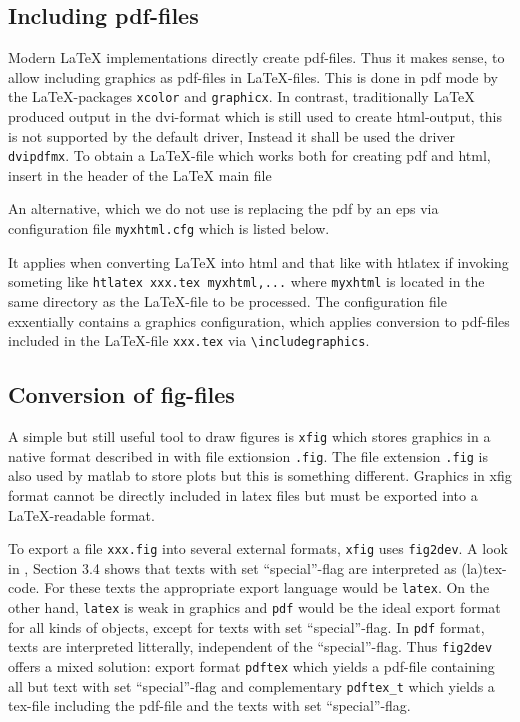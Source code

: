 \documentclass[12pt]{article}
\begin{document}
\subsection{Including pdf-files}\label{subsec:figpdf}

Modern \LaTeX{} implementations directly create pdf-files. 
Thus it makes sense, to allow including graphics as pdf-files 
in \LaTeX-files. 
This is done in pdf mode 
by the \LaTeX-packages {\tt xcolor} and {\tt graphicx}. 
In contrast, traditionally \LaTeX{} produced output in the \gls{dvi}-format 
which is still used to create \gls{html}-output, 
this is not supported by the default driver, 
Instead it shall be used the driver {\tt dvipdfmx}. 
To obtain a \LaTeX-file which works both for creating pdf and html, 
insert in the header of the \LaTeX{} main file 
%
\lstset{language=tex, basicstyle=\small}


An alternative, which we do not use 
is replacing the pdf by an \gls{eps} via configuration file {\tt myxhtml.cfg} 
which is listed below. 
%
\lstset{language=tex, basicstyle=\scriptsize}

%
It applies when converting \LaTeX{} into html and that like 
with htlatex if invoking someting like {\tt htlatex xxx.tex myxhtml,...} 
where {\tt myxhtml} is located in the same directory as the \LaTeX-file 
to be processed. 
The configuration file exxentially contains a graphics configuration, 
which applies conversion to pdf-files included in the \LaTeX-file {\tt xxx.tex}
via {\tt \textbackslash includegraphics}. 


\subsection{Conversion of fig-files}\label{subsec:fig2dev}

A simple but still useful tool to draw figures is {\tt xfig} 
which stores graphics in a native format 
described in \cite{XFigF} with file extionsion {\tt .fig}. 
The file extension {\tt .fig} is also used by matlab to store plots 
but this is something different. 
Graphics in xfig format cannot be directly included in latex files 
but must be exported into a \LaTeX-readable format. 

To export a file {\tt xxx.fig} into several external formats, 
{\tt xfig} uses {\tt fig2dev}. 
A look in \cite{XFigF}, Section 3.4 shows that texts with set ``special''-flag 
are interpreted as (la)tex-code. 
For these texts the appropriate export language would be {\tt latex}. 
On the other hand, {\tt latex} is weak in graphics 
and {\tt pdf} would be the ideal export format for all kinds of objects, 
except for texts with set ``special''-flag. 
In {\tt pdf} format, texts are interpreted litterally, 
independent of the ``special''-flag. 
Thus {\tt fig2dev} offers a mixed solution: 
export format {\tt pdftex} which yields a pdf-file 
containing all but text with set ``special''-flag 
and complementary {\tt pdftex\_t} which yields a tex-file 
including the pdf-file and the texts with set ``special''-flag. 
\end{document}
